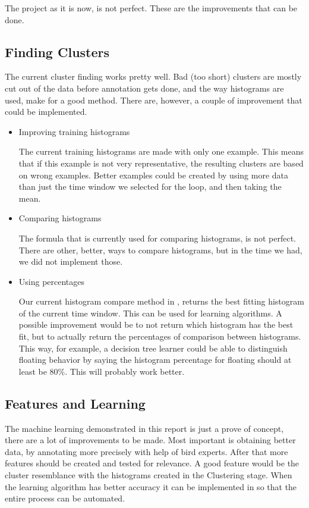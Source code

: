 The project as it is now, is not perfect. These are the improvements that can be done.
\subsection{Finding Clusters} 
The current cluster finding works pretty well. Bad (too short) clusters are
mostly cut out of the data before annotation gets done, and the way histograms
are used, make for a good method. There are, however, a couple of improvement
that could be implemented.

\begin{itemize}
 \item Improving training histograms

    The current training histograms are made with only one example. This means
    that if this example is not very representative, the resulting clusters are
    based on wrong examples. Better examples could be created by using more data
    than just the time window we selected for the loop, and then taking the
    mean.
 \item Comparing histograms

    The formula that is currently used for comparing histograms, is not perfect.
    There are other, better, ways to compare histograms, but in the time we had,
    we did not implement those.

 \item Using percentages
    
    Our current histogram compare method in \matlab, returns the best fitting
    histogram of the current time window. This can be 
    used for learning algorithms. A possible improvement would be to not return
    which histogram has the best fit, but to actually return the percentages of
    comparison between histograms. This way, for example, a decision tree
    learner could be able to distinguish floating behavior by saying the
    histogram percentage for floating should at least be 80\%. This will
    probably work better.
\end{itemize}
    

\subsection{Features and Learning}
The machine learning demonstrated in this report is just a prove of concept, there are a lot of improvements to be made. Most important is obtaining better data, by annotating more precisely with help of bird experts. After that more features should be created and tested for relevance. A good feature would be the cluster resemblance with the histograms created in the Clustering stage. When the learning algorithm has better accuracy it can be implemented in \matlab so that the entire process can be automated.